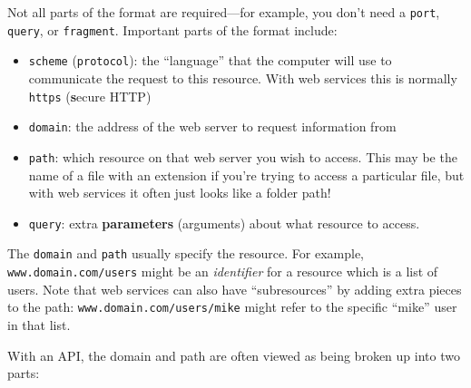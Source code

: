 \documentclass[]{book}
\providecommand{\tightlist}{%
  \setlength{\itemsep}{0pt}\setlength{\parskip}{0pt}}
\theoremstyle{definition}
\theoremstyle{definition}
\theoremstyle{remark}
\begin{document}
Not all parts of the format are required---for example, you don't need a
\texttt{port}, \texttt{query}, or \texttt{fragment}. Important parts of
the format include:

\begin{itemize}
\tightlist
\item
  \texttt{scheme} (\texttt{protocol}): the ``language'' that the
  computer will use to communicate the request to this resource. With
  web services this is normally \texttt{https} (\textbf{s}ecure HTTP)
\item
  \texttt{domain}: the address of the web server to request information
  from
\item
  \texttt{path}: which resource on that web server you wish to access.
  This may be the name of a file with an extension if you're trying to
  access a particular file, but with web services it often just looks
  like a folder path!
\item
  \texttt{query}: extra \textbf{parameters} (arguments) about what
  resource to access.
\end{itemize}

The \texttt{domain} and \texttt{path} usually specify the resource. For
example, \texttt{www.domain.com/users} might be an \emph{identifier} for
a resource which is a list of users. Note that web services can also
have ``subresources'' by adding extra pieces to the path:
\texttt{www.domain.com/users/mike} might refer to the specific ``mike''
user in that list.

With an API, the domain and path are often viewed as being broken up
into two parts:
\end{document}
